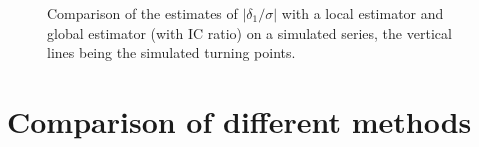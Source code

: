 \documentclass[
]{article}
\newcommand\1{\mathds{1}}
\begin{document}
\begin{figure}[H]

\caption{\label{fig-mmpenteconcac-ex}Comparison of the estimates of
\(|\delta_1/\sigma|\) with a local estimator and global estimator (with
IC ratio) on a simulated series, the vertical lines being the simulated
turning points.}

\begin{minipage}{\linewidth}



\end{minipage}%
\newline
\begin{minipage}{\linewidth}



\end{minipage}%

\end{figure}%

\section{Comparison of different methods}\label{sec-comparison}
\end{document}
